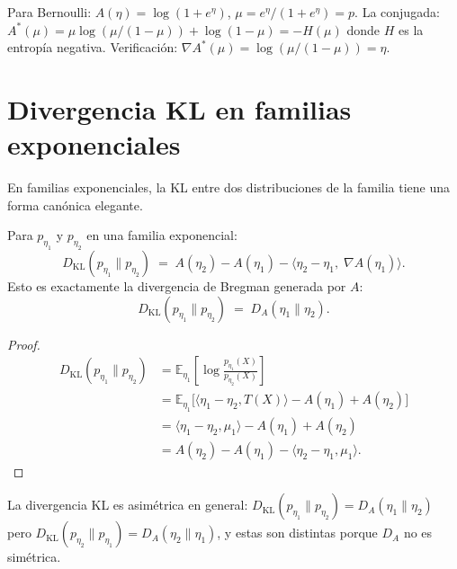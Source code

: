 \begin{example}
	Para Bernoulli: $A(\eta) = \log(1+e^\eta)$, $\mu = e^\eta/(1+e^\eta) = p$.
	La conjugada: $A^*(\mu) = \mu \log(\mu/(1-\mu)) + \log(1-\mu) = -H(\mu)$ donde $H$ es la entropía negativa.
	Verificación: $\nabla A^*(\mu) = \log(\mu/(1-\mu)) = \eta$.
\end{example}

\section{Divergencia KL en familias exponenciales}

En familias exponenciales, la KL entre dos distribuciones de la familia tiene una forma canónica elegante.

\begin{theorem}
	Para $p_{\eta_1}$ y $p_{\eta_2}$ en una familia exponencial:
	\[
	D_{\mathrm{KL}}(p_{\eta_1} \| p_{\eta_2}) \;=\; A(\eta_2) - A(\eta_1) - \langle \eta_2 - \eta_1,\; \nabla A(\eta_1) \rangle.
	\]
	Esto es exactamente la divergencia de Bregman generada por $A$:
	\[
	D_{\mathrm{KL}}(p_{\eta_1} \| p_{\eta_2}) \;=\; D_A(\eta_1 \| \eta_2).
	\]
\end{theorem}

\begin{proof}
	\begin{align*}
		D_{\mathrm{KL}}(p_{\eta_1} \| p_{\eta_2})
		&= \mathbb{E}_{\eta_1}\!\left[\log \frac{p_{\eta_1}(X)}{p_{\eta_2}(X)}\right] \\
		&= \mathbb{E}_{\eta_1}\!\Big[\langle \eta_1 - \eta_2, T(X) \rangle - A(\eta_1) + A(\eta_2)\Big] \\
		&= \langle \eta_1 - \eta_2, \mu_1 \rangle - A(\eta_1) + A(\eta_2) \\
		&= A(\eta_2) - A(\eta_1) - \langle \eta_2 - \eta_1, \mu_1 \rangle.
	\end{align*}
\end{proof}

\begin{corollary}[Asimetría de la KL]
	La divergencia KL es asimétrica en general: $D_{\mathrm{KL}}(p_{\eta_1} \| p_{\eta_2}) = D_A(\eta_1 \| \eta_2)$ pero $D_{\mathrm{KL}}(p_{\eta_2} \| p_{\eta_1}) = D_A(\eta_2 \| \eta_1)$, y estas son distintas porque $D_A$ no es simétrica.
\end{corollary}

